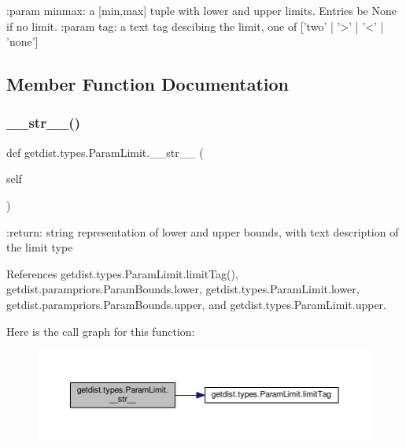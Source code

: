 \begin{DoxyVerb}:param minmax: a [min,max] tuple with lower and upper limits. Entries be None if no limit.
:param tag: a text tag descibing the limit, one of ['two' | '>' | '<' | 'none']
\end{DoxyVerb}
 

\subsection{Member Function Documentation}
\mbox{\label{classgetdist_1_1types_1_1ParamLimit_aa66cb00086e29517f2da06bb301758c4}} 
\subsubsection{\texorpdfstring{\+\_\+\+\_\+str\+\_\+\+\_\+()}{\_\_str\_\_()}}
{\footnotesize\ttfamily def getdist.\+types.\+Param\+Limit.\+\_\+\+\_\+str\+\_\+\+\_\+ (\begin{DoxyParamCaption}\item[{}]{self }\end{DoxyParamCaption})}

\begin{DoxyVerb}:return: string representation of lower and upper bounds, with text description of the limit type
\end{DoxyVerb}
 

References getdist.\+types.\+Param\+Limit.\+limit\+Tag(), getdist.\+parampriors.\+Param\+Bounds.\+lower, getdist.\+types.\+Param\+Limit.\+lower, getdist.\+parampriors.\+Param\+Bounds.\+upper, and getdist.\+types.\+Param\+Limit.\+upper.

Here is the call graph for this function\+:
\nopagebreak
\begin{figure}[H]
\begin{center}
\leavevmode
\includegraphics[width=350pt]{classgetdist_1_1types_1_1ParamLimit_aa66cb00086e29517f2da06bb301758c4_cgraph}
\end{center}
\end{figure}
\mbox{\label{classgetdist_1_1types_1_1ParamLimit_a06297a09c2c213f58005465681751d6f}} 
